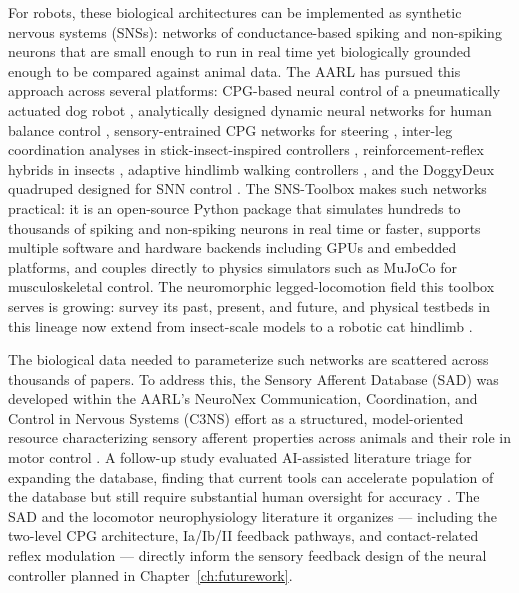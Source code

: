 For robots, these biological architectures can be implemented as synthetic nervous systems (SNSs): networks of conductance-based spiking and non-spiking neurons that are small enough to run in real time yet biologically grounded enough to be compared against animal data. The AARL has pursued this approach across several platforms: CPG-based neural control of a pneumatically actuated dog robot \citep{hunt_development_2017}, analytically designed dynamic neural networks for human balance control \citep{hilts_dynamic_2019}, sensory-entrained CPG networks for steering \citep{li_neural_2016}, inter-leg coordination analyses in stick-insect-inspired controllers \citep{nourse_analyzing_2019}, reinforcement-reflex hybrids in insects \citep{goldsmith_investigating_2021}, adaptive hindlimb walking controllers \citep{schilling_adaptive_2022}, and the DoggyDeux quadruped designed for SNN control \citep{scharzenberger_design_2019}. The SNS-Toolbox \citep{nourse_sns_2023} makes such networks practical: it is an open-source Python package that simulates hundreds to thousands of spiking and non-spiking neurons in real time or faster, supports multiple software and hardware backends including GPUs and embedded platforms, and couples directly to physics simulators such as MuJoCo for musculoskeletal control. The neuromorphic legged-locomotion field this toolbox serves is growing: \citet{szczecinski_perspective_2023} survey its past, present, and future, and physical testbeds in this lineage now extend from insect-scale models to a robotic cat hindlimb \citep{armstead_design_2025}.

The biological data needed to parameterize such networks are scattered across thousands of papers. To address this, the Sensory Afferent Database (SAD) was developed within the AARL's NeuroNex Communication, Coordination, and Control in Nervous Systems (C3NS) effort as a structured, model-oriented resource characterizing sensory afferent properties across animals and their role in motor control \citep{bolen_sensory_2023}. A follow-up study evaluated AI-assisted literature triage for expanding the database, finding that current tools can accelerate population of the database but still require substantial human oversight for accuracy \citep{bolen_using_2024}. The SAD and the locomotor neurophysiology literature it organizes --- including the two-level CPG architecture, Ia/Ib/II feedback pathways, and contact-related reflex modulation --- directly inform the sensory feedback design of the neural controller planned in Chapter~\ref{ch:futurework}.

